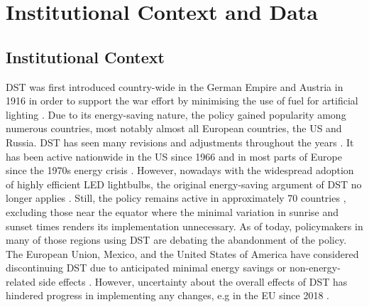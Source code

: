 \section{Institutional Context and Data}
\subsection{Institutional Context}
\ac{DST} was first introduced country-wide in the German Empire and Austria in 1916 in order to support the war effort by minimising the use of fuel for artificial lighting \parencite{Reichsgesetzblatt}. Due to its energy-saving nature, the policy gained popularity among numerous countries, most notably almost all European countries, the US and Russia. \ac{DST} has seen many revisions and adjustments throughout the years \parencite{prerau_book}. It has been active nationwide in the US since 1966 \parencite{Uniform} and in most parts of Europe since the 1970s energy crisis \parencite{pearce_great_2017}.  
However, nowadays with the widespread adoption of highly efficient LED lightbulbs, the original energy-saving argument of \ac{DST} no longer applies \parencite{aries_effect_2008}.
Still, the policy remains active in approximately 70 countries \parencite{prerau_book}, excluding those near the equator where the minimal variation in sunrise and sunset times renders its implementation unnecessary. As of today, policymakers in many of those regions using \ac{DST} are debating the abandonment of the policy. The European Union, Mexico, and the United States of America have considered discontinuing DST due to anticipated minimal energy savings or non-energy-related side effects \parencite{guven, mexico_congress, congress}. However, uncertainty about the overall effects of DST has hindered progress in implementing any changes, e.g in the EU since 2018 \parencite{eu_directive}.
\newline
